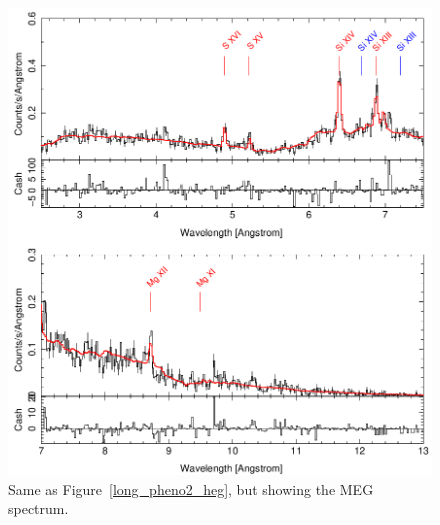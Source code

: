 \begin{figure}[t]
    \centering
        \includegraphics[width = \linewidth]{Chapters/Figures/long_pheno2_meg.png}
        \caption{Same as Figure~\ref{long_pheno2_heg}, but showing the MEG spectrum.}
    \label{long_pheno2_meg}
\end{figure}


